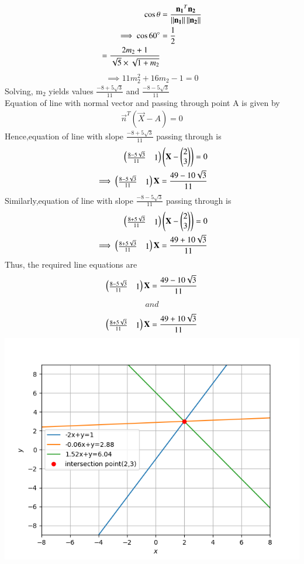 \documentclass[journal,12pt,twocolumn]{IEEEtran}
\begin{document}
\begin{align}
\cos \theta &= \frac{\mathbf{n_1}^T\mathbf{n_2}}{\left\lVert\mathbf{n_1}\right\rVert\left\lVert\mathbf{n_2}\right\rVert}\\
\implies \cos 60\degree &=\frac{1}{2}\\ 
=\frac{2m_2+1}{\sqrt5\times\sqrt{1+m_2}}
\end{align}
 \begin{align}
 \implies 11m_2^2+16m_2-1=0
 \end{align}
 Solving, m$_2$ yields values $\frac{-8+5\sqrt{3}}{11}$ and $\frac{-8-5\sqrt{3}}{11}$ \\
 Equation of line with normal vector and passing through point A is given by
 \begin{align}
 \vec{n}^T(\vec{X}-A)=0
 \end{align}
  Hence,equation of line with slope $\frac{-8+5\sqrt{3}}{11}$ passing through  is
  \begin{align}
  \begin{pmatrix}\frac{8-5\sqrt{3}}{11}&1\end{pmatrix}\left(\mathbf{X}-\begin{pmatrix}2\\3\end{pmatrix}\right)=0\\
  \implies \begin{pmatrix}\frac{8-5\sqrt{3}}{11}&1\end{pmatrix}\mathbf{X}=\frac{49-10\sqrt{3}}{11}
  \end{align}
  Similarly,equation of line with slope $\frac{-8-5\sqrt{3}}{11}$ passing through  is
  \begin{align}
  \begin{pmatrix}\frac{8+5\sqrt{3}}{11}&1\end{pmatrix}\left(\mathbf{X}-\begin{pmatrix}2\\3\end{pmatrix}\right)=0\\
  \implies \begin{pmatrix}\frac{8+5\sqrt{3}}{11}&1\end{pmatrix}\mathbf{X}=\frac{49+10\sqrt{3}}{11}
  \end{align}
  Thus, the required line equations are
  \begin{align}
  \begin{pmatrix}\frac{8-5\sqrt{3}}{11}&1\end{pmatrix}\mathbf{X}=\frac{49-10\sqrt{3}}{11} 
  \end{align}
  \begin{align}
  and
  \end{align}
  \begin{align}
   \begin{pmatrix}\frac{8+5\sqrt{3}}{11}&1\end{pmatrix}\mathbf{X}=\frac{49+10\sqrt{3}}{11}
  \end{align}
  \includegraphics{plot.png}
\end{document}
